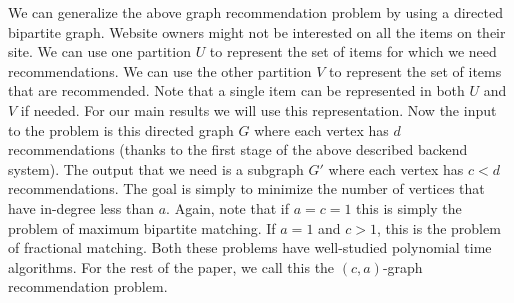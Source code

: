 











We can generalize the above graph recommendation problem by using a directed bipartite graph.
Website owners might not be interested on all the items on their site. We can use one partition $U$
to represent the set of items for which we need recommendations. We can use the other partition $V$
to represent the set of items that are recommended. Note that a single item can be represented in
both $U$ and $V$ if needed. For our main results we will use this representation. Now the input
to the problem is this directed graph $G$ where each vertex has $d$ recommendations (thanks to the
first stage of the above described backend system). The output that we need is a subgraph $G'$
where each vertex has $c < d$ recommendations. The goal is simply to minimize the number of vertices
that have in-degree less than $a$. Again, note that if $a=c=1$ this is simply the problem of
maximum bipartite matching\cite{}. If $a=1$ and $c > 1$, this is the problem of fractional
matching\cite{}. Both these problems have well-studied polynomial time algorithms\cite{}. For the
rest of the paper, we call this the $(c, a)$-graph recommendation problem. \vs

